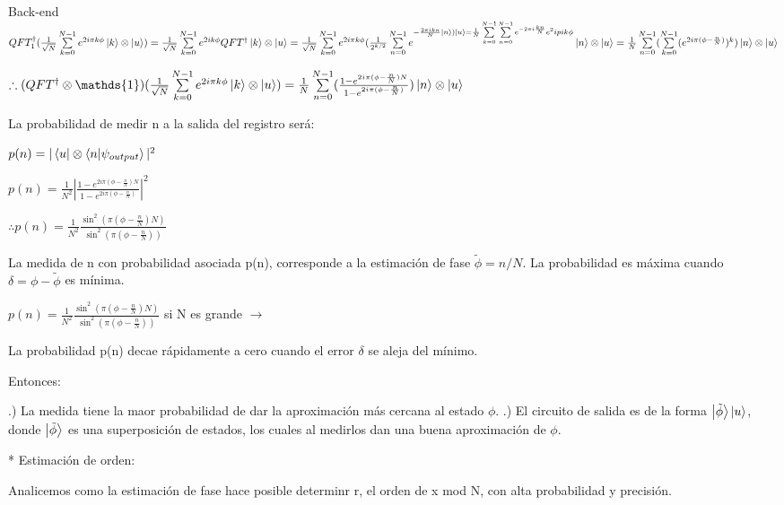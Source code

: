 \documentclass[11pt, spanish]{report}
\begin{document}
Back-end $QFT_1^\dagger (\frac{1}{\sqrt{N}} \sum\limits_{k=0}^{N-1} e^{2 i \pi k \phi} \ket{k} \otimes \ket{u}) = \frac{1}{\sqrt{N}} \sum\limits_{k=0}^{N-1} e^{2 i k \phi} QFT^\dagger \ket{k} \otimes \ket{u} = \frac{1}{\sqrt{N}} \sum\limits_{k=0}^{N-1} e^{2 i \pi k \phi} (\frac{1}{2^{k/2}} \sum\limits_{n=0}^{N-1} e^{-\frac{2 \pi i k n}{N} \ket{n}) \ket{u} = \frac{1}{N} \sum\limits_{k=0}^{N-1} \sum\limits_{n=0}^{N-1} e^{- 2 \pi i \frac{k n}{N}} e^2 i pi k \phi} \ket{n} \otimes \ket{u} = \frac{1}{N} \sum\limits_{n=0}^{N-1} (\sum\limits_{k=0}^{N-1} (e^{2 i \pi (\phi - \frac{n}{N})})^k ) \ket{n} \otimes \ket{u}$

$\therefore (QFT^\dagger \otimes \mathds{1}) (\frac{1}{\sqrt{N}} \sum\limits_{k=0}^{N-1} e^{2 i \pi k \phi} \ket{k} \otimes \ket{u}) = \frac{1}{N} \sum\limits_{n=0}^{N-1} (\frac{1 - e^{2 i \pi (\phi - \frac{n}{N})N}}{1 - e^{2 i \pi (\phi - \frac{n}{N})}}) \ket{n} \otimes \ket{u}$

La probabilidad de medir n a la salida del registro será:

$p(n) = |\bra{u} \otimes \bra{n} \ket{\psi_{output}}|^2$

$p(n) = \frac{1}{N^2} |\frac{1 - e^{2 i \pi (\phi - \frac{n}{N})N}}{1 - e^{2 i \pi (\phi - \frac{n}{N})}}|^2$

$\therefore p(n) = \frac{1}{N^2} \frac{\sin^2(\pi (\phi - \frac{n}{N}) N)}{\sin^2(\pi (\phi - \frac{n}{N}))}$

La medida de n con probabilidad asociada p(n), corresponde a la estimación de fase $\tilde{\phi} = n/N$. La probabilidad es máxima cuando $\delta = \phi - \tilde{\phi}$ es mínima.

$p(n) = \frac{1}{N^2} \frac{\sin^2(\pi (\phi - \frac{n}{N}) N)}{\sin^2(\pi (\phi - \frac{n}{N}))}$ si N es grande $\rightarrow$ %

La probabilidad p(n) decae rápidamente a cero cuando el error $\delta$ se aleja del mínimo.

Entonces:

.) La medida tiene la maor probabilidad de dar la aproximación más cercana al estado $\phi$.
.) El circuito de salida es de la forma $\ket{\tilde{\phi}} \ket{u}$, donde $\ket{\tilde{\phi}}$ es una superposición de estados, los cuales al medirlos dan una buena aproximación de $\phi$.

* Estimación de orden:

Analicemos como la estimación de fase hace posible determinr r, el orden de x mod N, con alta probabilidad y precisión.
\end{document}
